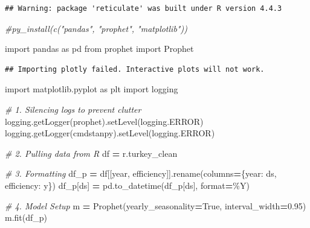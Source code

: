 \documentclass[
]{article}
\newenvironment{Shaded}{\begin{snugshade}}{\end{snugshade}}
\newcommand{\BuiltInTok}[1]{#1}
\newcommand{\CommentTok}[1]{\textcolor[rgb]{0.56,0.35,0.01}{\textit{#1}}}
\newcommand{\FloatTok}[1]{\textcolor[rgb]{0.00,0.00,0.81}{#1}}
\newcommand{\ImportTok}[1]{#1}
\newcommand{\NormalTok}[1]{#1}
\newcommand{\OperatorTok}[1]{\textcolor[rgb]{0.81,0.36,0.00}{\textbf{#1}}}
\newcommand{\StringTok}[1]{\textcolor[rgb]{0.31,0.60,0.02}{#1}}
\newcommand{\VariableTok}[1]{\textcolor[rgb]{0.00,0.00,0.00}{#1}}
\begin{document}
\begin{verbatim}
## Warning: package 'reticulate' was built under R version 4.4.3
\end{verbatim}

\begin{Shaded}
\begin{Highlighting}[]
\CommentTok{\#py\_install(c("pandas", "prophet", "matplotlib"))}
\end{Highlighting}
\end{Shaded}

\begin{Shaded}
\begin{Highlighting}[]
\ImportTok{import}\NormalTok{ pandas }\ImportTok{as}\NormalTok{ pd}
\ImportTok{from}\NormalTok{ prophet }\ImportTok{import}\NormalTok{ Prophet}
\end{Highlighting}
\end{Shaded}

\begin{verbatim}
## Importing plotly failed. Interactive plots will not work.
\end{verbatim}

\begin{Shaded}
\begin{Highlighting}[]
\ImportTok{import}\NormalTok{ matplotlib.pyplot }\ImportTok{as}\NormalTok{ plt}
\ImportTok{import}\NormalTok{ logging}

\CommentTok{\# 1. Silencing logs to prevent clutter}
\NormalTok{logging.getLogger(}\StringTok{\textquotesingle{}prophet\textquotesingle{}}\NormalTok{).setLevel(logging.ERROR)}
\NormalTok{logging.getLogger(}\StringTok{\textquotesingle{}cmdstanpy\textquotesingle{}}\NormalTok{).setLevel(logging.ERROR)}

\CommentTok{\# 2. Pulling data from R}
\NormalTok{df }\OperatorTok{=}\NormalTok{ r.turkey\_clean}

\CommentTok{\# 3. Formatting}
\NormalTok{df\_p }\OperatorTok{=}\NormalTok{ df[[}\StringTok{\textquotesingle{}year\textquotesingle{}}\NormalTok{, }\StringTok{\textquotesingle{}efficiency\textquotesingle{}}\NormalTok{]].rename(columns}\OperatorTok{=}\NormalTok{\{}\StringTok{\textquotesingle{}year\textquotesingle{}}\NormalTok{: }\StringTok{\textquotesingle{}ds\textquotesingle{}}\NormalTok{, }\StringTok{\textquotesingle{}efficiency\textquotesingle{}}\NormalTok{: }\StringTok{\textquotesingle{}y\textquotesingle{}}\NormalTok{\})}
\NormalTok{df\_p[}\StringTok{\textquotesingle{}ds\textquotesingle{}}\NormalTok{] }\OperatorTok{=}\NormalTok{ pd.to\_datetime(df\_p[}\StringTok{\textquotesingle{}ds\textquotesingle{}}\NormalTok{], }\BuiltInTok{format}\OperatorTok{=}\StringTok{\textquotesingle{}\%Y\textquotesingle{}}\NormalTok{)}

\CommentTok{\# 4. Model Setup}
\NormalTok{m }\OperatorTok{=}\NormalTok{ Prophet(yearly\_seasonality}\OperatorTok{=}\VariableTok{True}\NormalTok{, interval\_width}\OperatorTok{=}\FloatTok{0.95}\NormalTok{)}
\NormalTok{m.fit(df\_p)}
\end{Highlighting}
\end{Shaded}
\end{document}
